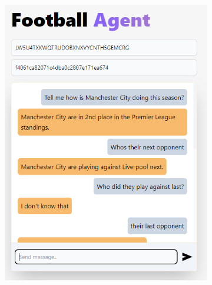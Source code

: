 \documentclass[10pt,a4paper,twocolumn]{article}
\begin{document}
\begin{figure}
    \centering
    \begin{subfigure}[b]{0.48\textwidth}
        \centering
        \includegraphics[width=\textwidth]{assets/Screenshot_9.png}
    \end{subfigure}
    \hfill
    \begin{subfigure}[b]{0.48\textwidth}
        \centering

\end{subfigure}
\end{figure}
\end{document}
